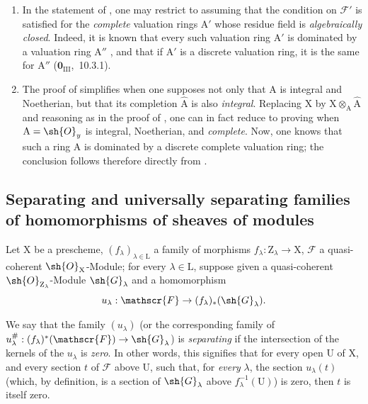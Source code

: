 \begin{remarks}[11.8.2]
\label{IV.11.8.2}
\medskip\noindent
\begin{enumerate}[label=(\roman*)]
  \item In the statement of , one may restrict to assuming that the condition on $\mathscr{F}'$ is satisfied for the \emph{complete} valuation rings $\mathrm{A}'$ whose residue field is \emph{algebraically closed}.
  Indeed, it is known that every such valuation ring $\mathrm{A}'$ is dominated by a valuation ring $\mathrm{A}''$ , and that if $\mathrm{A}'$ is a discrete valuation ring, it is the same for $\mathrm{A}''$ ($\mathbf{0}_{\mathrm{III}}$,~10.3.1).
  \item The proof of  simplifies when one supposes not only that $\mathrm{A}$ is integral and Noetherian, but that its completion $\hat{\mathrm{A}}$ is also \emph{integral}.
  Replacing $\mathrm{X}$ by $\mathrm{X}\otimes_\mathrm{A}\hat{\mathrm{A}}$ and reasoning as in the proof of , one can in fact reduce to proving  when $\mathrm{A}=\sh{O}_y$ is integral, Noetherian, and \emph{complete}.
  Now, one knows  that such a ring $\mathrm{A}$ is dominated by a discrete complete valuation ring; the conclusion follows therefore directly from .
\end{enumerate}
\end{remarks}

\subsection{Separating and universally separating families of homomorphisms of sheaves of modules}
\label{subsection:IV.11.9}

\begin{env}[11.9.1]
\label{IV.11.9.1}
Let $\mathrm{X}$ be a prescheme, $(f_\lambda)_{\lambda\in\mathrm{L}}$ a family of morphisms $f_\lambda:\mathrm{Z}_\lambda\to\mathrm{X}$, $\mathscr{F}$ a quasi-coherent $\sh{O}_\mathrm{X}$-Module; for every $\lambda\in\mathrm{L}$, suppose given a quasi-coherent $\sh{O}_{\mathrm{Z}_\lambda}$-Module $\sh{G}_\lambda$ and a homomorphism
\[
  u_\lambda:\mathscr{F}\to(f_\lambda)_*(\sh{G}_\lambda).
\label{IV.11.9.1.1}
\]
\end{env}

We say that the family $(u_\lambda)$ (or the corresponding family of $u_\lambda^{\#}:(f_\lambda)^*(\mathscr{F})\to\sh{G}_\lambda$) is \emph{separating} if the intersection of the kernels of the $u_\lambda$ is \emph{zero}.
In other words, this signifies that for every open $\mathrm{U}$ of $\mathrm{X}$, and every section $t$ of $\mathscr{F}$ above $\mathrm{U}$, such that, for \emph{every} $\lambda$, the section $u_\lambda(t)$ (which, by definition, is a section of $\sh{G}_\lambda$ above $f_\lambda^{-1}(\mathrm{U})$) is zero, then $t$ is itself zero.

